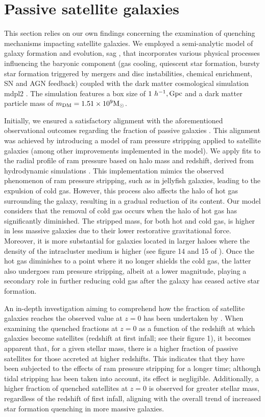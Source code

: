\documentclass[baaa]{baaa}
\begin{document}
\section{Passive satellite galaxies}
\label{Sec:PassiveSat}

This section relies on our own findings concerning the examination of quenching mechanisms impacting satellite galaxies. We employed a semi-analytic model of galaxy formation and evolution, {\sc sag} \citep{Cora_2018}, that incorporates various physical processes influencing the baryonic component (gas cooling, quiescent star formation, bursty star formation triggered by mergers and disc instabilities, chemical enrichment, SN and AGN feedback) coupled with the dark matter cosmological simulation {\sc mdpl2} \citep{Klypin_2016}. The simulation features a box size of $1~h^{-1},{\rm Gpc}$ and a dark matter particle mass of $m_{\rm DM}=1.51 \times 10^9{\rm M}_{\odot}$. 

Initially, we ensured a satisfactory alignment with the aforementioned observational outcomes regarding the fraction of passive galaxies \citep{Wetzel_2012}. This alignment was achieved by introducing a model of ram pressure stripping applied to satellite galaxies (among other improvements implemented in the model). We apply fits to the radial profile of ram pressure based on halo mass and redshift, derived from hydrodynamic simulations \citep{VegaMartinez_2022}. This implementation mimics the observed phenomenon of ram pressure stripping, such as in jellyfish galaxies, leading to the expulsion of cold gas. However, this process also affects the halo of hot gas surrounding the galaxy, resulting in a gradual reduction of its content. Our model considers that the removal of cold gas occurs when the halo of hot gas has significantly diminished. The stripped mass, for both hot and cold gas, is higher in less massive galaxies due to their lower restorative gravitational force. Moreover, it is more substantial for galaxies located in larger haloes where the density of the intracluster medium is higher (see figure 14 and 15 of \citealt{Cora_2018}). Once the hot gas diminishes to a point where it no longer shields the cold gas, the latter also undergoes ram pressure stripping, albeit at a lower magnitude, playing a secondary role in further reducing cold gas after the galaxy has ceased active star formation.

An in-depth investigation aiming to comprehend how the fraction of satellite galaxies reaches the observed value at $z=0$ has been undertaken by \cite{Cora_2019}. When examining the quenched fractions at $z=0$ as a function of the redshift at which galaxies become satellites (redshift at first infall; see their figure 1), it becomes apparent that, for a given stellar mass, there is a higher fraction of passive satellites for those accreted at higher redshifts. This indicates that they have been subjected to the effects of ram pressure stripping for a longer time; although tidal stripping has been taken into account, its effect is negligible. Additionally, a higher fraction of quenched satellites at $z=0$ is observed for greater stellar mass, regardless of the redshift of first infall, aligning with the overall trend of increased star formation quenching in more massive galaxies. 
\end{document}
